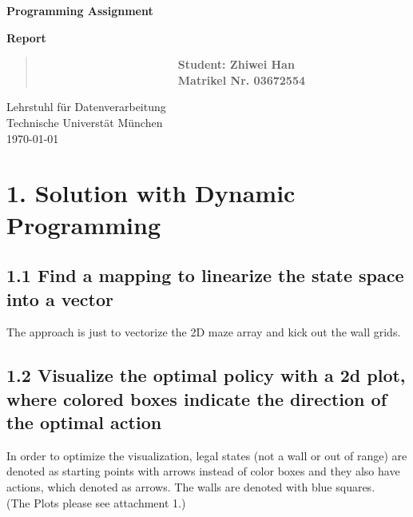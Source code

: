 \documentclass[12pt,a4paper,titlepage]{article}
\begin{document}
\begin{titlepage}
    \begin{center}
        \vspace*{3.5cm}
        
        \textbf{\huge{Programming Assignment}}
        \vspace{1cm}

        \textbf{\huge{Report}}

        \vspace{6cm}

        \begin{verse}
            \ \ \ \ \ \ \ \ \ \ \ \ \ \ \ \ \ \ \ \ \ \ \ \ \ \textbf{\large{Student: Zhiwei Han}}\\
            \ \ \ \ \ \ \ \ \ \ \ \ \ \ \ \ \ \ \ \ \ \ \ \ \ \textbf{\large{Matrikel Nr. 03672554
            }}\\
        \end{verse}


        
        \vspace{1cm}
        
        
        Lehrstuhl f\"ur Datenverarbeitung\\
        Technische Universt\"at M\"unchen\\
        \today
        
    \end{center}
\end{titlepage}



\setlength{\parindent}{0pt} \setlength{\parskip}{2ex plus 0.5ex
minus 0.2ex}


\section*{1. Solution with Dynamic Programming}
\subsection*{1.1 Find a mapping to linearize the state space into a vector}
The approach is just to vectorize the 2D maze array and kick out the wall grids.
\subsection*{1.2 Visualize the optimal policy with a 2d plot, where colored boxes indicate the direction of the optimal action}
In order to optimize the visualization, legal states (not a wall or out of range) are denoted as starting points with arrows instead of color boxes and they also have actions, which denoted as arrows. The walls are denoted with blue squares.\\
(The Plots please see attachment 1.)
\end{document}
